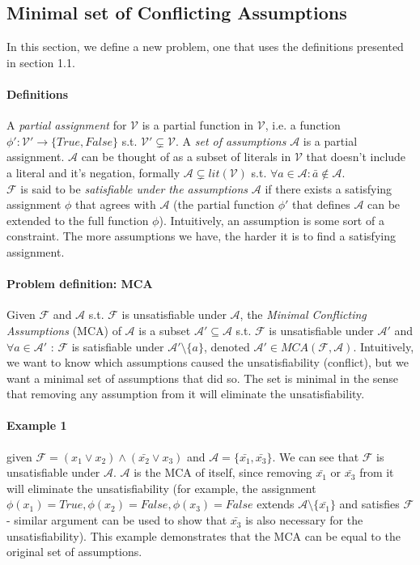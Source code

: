 \documentclass[]{article}
\begin{document}
	\subsection{Minimal set of Conflicting Assumptions}
	In this section, we define a new problem, one that uses the definitions presented in section 1.1.
	\paragraph{Definitions} A \textit{partial assignment} for $ \mathcal{V} $ is a partial function in $ \mathcal{V} $, i.e. a function $ \phi' : \mathcal{V}' \rightarrow \{True, False\} $ s.t. $\mathcal{V}' \subsetneq \mathcal{V}$. A \textit{set of assumptions} $ \mathcal{A} $ is a partial assignment. $ \mathcal{A} $ can be thought of as a subset of literals in $\mathcal{V}$ that doesn't include a literal and it's negation, formally $ \mathcal{A} \subsetneq lit(\mathcal{V}) $ s.t. $ \forall a \in \mathcal{A} : \bar{a} \notin \mathcal{A} $.\\
	$ \mathcal{F} $ is said to be \textit{satisfiable under the assumptions} $ \mathcal{A} $ if there exists a satisfying assignment $ \phi $ that agrees with $ \mathcal{A} $ (the partial function $ \phi' $ that defines $ \mathcal{A} $ can be extended to the full function $ \phi $). Intuitively, an assumption is some sort of a constraint. The more assumptions we have, the harder it is to find a satisfying assignment.
	\paragraph{Problem definition: MCA} Given $ \mathcal{F} $ and $ \mathcal{A} $ s.t. $ \mathcal{F} $ is unsatisfiable under $ \mathcal{A} $, the \textit{Minimal Conflicting Assumptions} (MCA) of $ \mathcal{A} $ is a subset $ \mathcal{A}' \subseteq \mathcal{A} $ s.t. $ \mathcal{F} $ is unsatisfiable under $ \mathcal{A}' $ and $ \forall a \in \mathcal{A}' $ : $ \mathcal{F} $ is satisfiable under $ \mathcal{A}' \setminus \{a\} $, denoted $ \mathcal{A}' \in MCA(\mathcal{F},\mathcal{A}) $. Intuitively, we want to know which assumptions caused the unsatisfiability (conflict), but we want a minimal set of assumptions that did so. The set is minimal in the sense that removing any assumption from it will eliminate the unsatisfiability.\\
	\paragraph{Example 1 } given  $\mathcal{F} = (x_1 \lor x_2) \land (\bar{x_2} \lor x_3)$ and $\mathcal{A} =\{\bar{x_1}, \bar{x_3}\}$. We can see that $ \mathcal{F} $ is unsatisfiable under $ \mathcal{A} $. $ \mathcal{A} $ is the MCA of itself, since removing $\bar{x_1}$ or $\bar{x_3}$ from it will eliminate the unsatisfiability (for example, the assignment $ \phi(x_1)=True,\phi(x_2)=False, \phi(x_3)=False $ extends $ \mathcal{A} \setminus \{\bar{x_1}\} $ and satisfies $\mathcal{F}$ - similar argument can be used to show that $\bar{x_3}$ is also necessary for the unsatisfiability). This example demonstrates that the MCA can be equal to the original set of assumptions.
\end{document}
